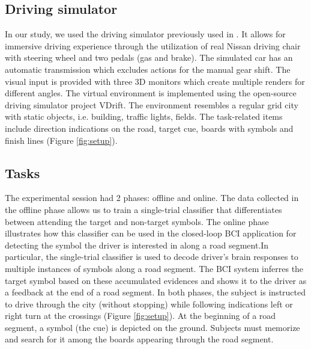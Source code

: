 \documentclass[12pt]{iopart}
\begin{document}
\subsection{Driving simulator}
In our study, we used the driving simulator previously used in
\cite{khaliliardali_action_2015,zhang_eeg-based_2015,renold_eeg_2014}.
It allows for immersive driving experience through the utilization
of real Nissan driving chair with steering wheel and two pedals (gas and brake).
The simulated car has an automatic transmission which excludes actions for
the manual gear shift.
The visual input is provided with three 3D monitors which create multiple renders for
different angles. The virtual environment is implemented using
the open-source driving simulator project VDrift. %
The environment resembles a regular grid city with static objects, i.e.
building, traffic lights, fields. The task-related items include
direction indications on the road, target cue, boards with symbols
and finish lines (Figure \ref{fig:setup}).



\subsection{Tasks}
The experimental session had 2 phases: offline and online.
The data collected in the offline phase allows us to train a single-trial classifier that differentiates between attending the target and non-target symbols. The online phase illustrates how this classifier can be used in the closed-loop BCI application for detecting the symbol the driver is interested in along a road segment.In particular, the single-trial classifier is used to decode driver's brain responses to multiple instances of symbols along a road segment. The BCI system inferres the target symbol based on these accumulated evidences and shows it to the driver as a feedback at the end of a road segment.
In both phases, the subject is instructed to drive through the city (without stopping) while
following indications left or right turn at the crossings (Figure \ref{fig:setup}).
At the beginning of a road segment, a symbol (the cue) is depicted
on the ground. Subjects must memorize and search for it among
the boards appearing through the road segment.
\end{document}
